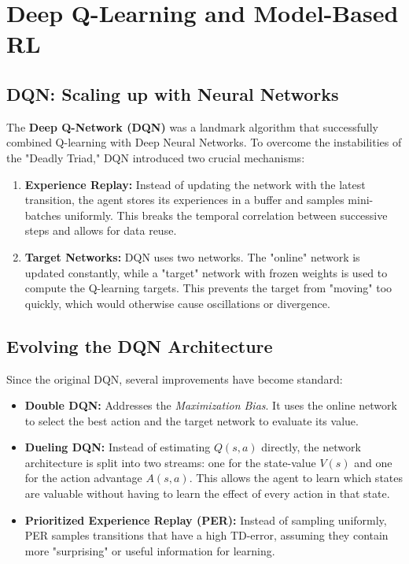 \section{Deep Q-Learning and Model-Based RL}

\subsection{DQN: Scaling up with Neural Networks}
The \textbf{Deep Q-Network (DQN)} was a landmark algorithm that successfully combined Q-learning with Deep Neural Networks. To overcome the instabilities of the "Deadly Triad," DQN introduced two crucial mechanisms:
\begin{enumerate}
    \item \textbf{Experience Replay:} Instead of updating the network with the latest transition, the agent stores its experiences in a buffer and samples mini-batches uniformly. This breaks the temporal correlation between successive steps and allows for data reuse.
    \item \textbf{Target Networks:} DQN uses two networks. The "online" network is updated constantly, while a "target" network with frozen weights is used to compute the Q-learning targets. This prevents the target from "moving" too quickly, which would otherwise cause oscillations or divergence.
\end{enumerate}

\subsection{Evolving the DQN Architecture}
Since the original DQN, several improvements have become standard:
\begin{itemize}
    \item \textbf{Double DQN:} Addresses the \textit{Maximization Bias}. It uses the online network to select the best action and the target network to evaluate its value.
    \item \textbf{Dueling DQN:} Instead of estimating $Q(s, a)$ directly, the network architecture is split into two streams: one for the state-value $V(s)$ and one for the action advantage $A(s, a)$. This allows the agent to learn which states are valuable without having to learn the effect of every action in that state.
    \item \textbf{Prioritized Experience Replay (PER):} Instead of sampling uniformly, PER samples transitions that have a high TD-error, assuming they contain more "surprising" or useful information for learning.
\end{itemize}

